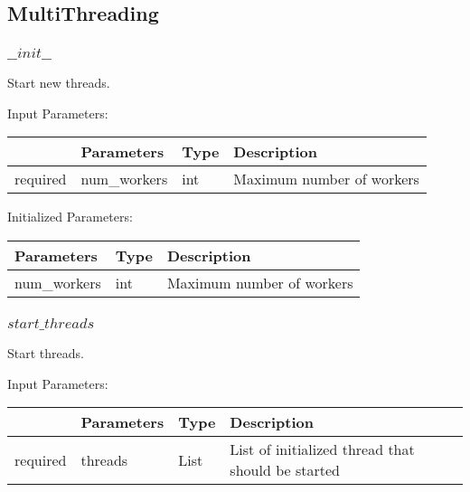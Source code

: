 \documentclass[
	ngerman,
	accentcolor=9c,%
	type=intern,
	marginpar=false
	]{tudapub}
\begin{document}
\vspace{1cm}



\subsection{MultiThreading}
\subsubsection{$\_\_init\_\_$}
\noindent Start new threads.


\vspace{0.5cm}
\noindent Input Parameters:
\vspace{0.5cm}

\begin{tabular}{|p{}|p{}|p{}| p{}|}
\hline
 & \textbf{Parameters} & \textbf{Type} & \textbf{Description} \\
\hline
required & num\_workers & int & Maximum number of workers \\
\hline
\end{tabular}

\vspace{0.5cm}
\noindent Initialized Parameters:
\vspace{0.5cm}

\begin{tabular}{|p{}| p{}| p{}|}
\hline
\textbf{Parameters} & \textbf{Type} & \textbf{Description} \\
\hline
num\_workers & int & Maximum number of workers \\
\hline
\end{tabular}
\vspace{1cm}

\subsubsection{$start\_threads$}
\noindent Start threads.


\vspace{0.5cm}
\noindent Input Parameters:
\vspace{0.5cm}

\begin{tabular}{|p{}|p{}|p{}| p{}|}
\hline
 & \textbf{Parameters} & \textbf{Type} & \textbf{Description} \\
\hline
required & threads & List & List of initialized thread that should be started \\
\hline
\end{tabular}
\vspace{1cm}
\end{document}
